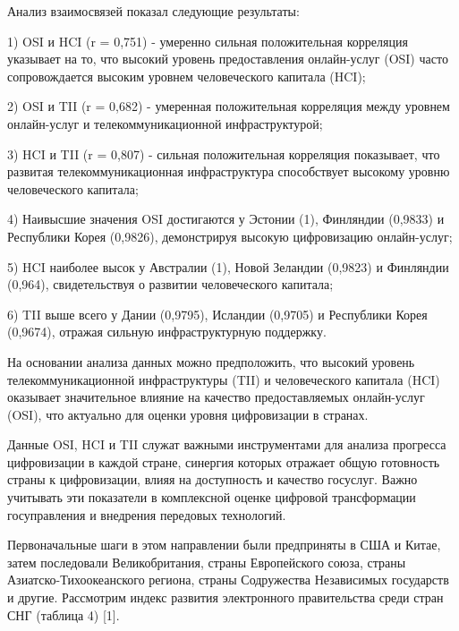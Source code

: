 \begin{multicols}{2}
Анализ взаимосвязей показал следующие результаты:

1) OSI и HCI (r = 0,751) - умеренно сильная положительная корреляция
указывает на то, что высокий уровень предоставления онлайн-услуг (OSI)
часто сопровождается высоким уровнем человеческого капитала (HCI);

2) OSI и TII (r = 0,682) - умеренная положительная корреляция между
уровнем онлайн-услуг и телекоммуникационной инфраструктурой;

3) HCI и TII (r = 0,807) - сильная положительная корреляция показывает,
что развитая телекоммуникационная инфраструктура способствует высокому
уровню человеческого капитала;

4) Наивысшие значения OSI достигаются у Эстонии (1), Финляндии (0,9833)
и Республики Корея (0,9826), демонстрируя высокую цифровизацию
онлайн-услуг;

5) HCI наиболее высок у Австралии (1), Новой Зеландии (0,9823) и
Финляндии (0,964), свидетельствуя о развитии человеческого капитала;

6) TII выше всего у Дании (0,9795), Исландии (0,9705) и Республики Корея
(0,9674), отражая сильную инфраструктурную поддержку.

На основании анализа данных можно предположить, что высокий уровень
телекоммуникационной инфраструктуры (TII) и человеческого капитала (HCI)
оказывает значительное влияние на качество предоставляемых онлайн-услуг
(OSI), что актуально для оценки уровня цифровизации в странах.

Данные OSI, HCI и TII служат важными инструментами для анализа прогресса
цифровизации в каждой стране, синергия которых отражает общую готовность
страны к цифровизации, влияя на доступность и качество госуслуг. Важно
учитывать эти показатели в комплексной оценке цифровой трансформации
госуправления и внедрения передовых технологий.

Первоначальные шаги в этом направлении были предприняты в США и Китае,
затем последовали Великобритания, страны Европейского союза, страны
Азиатско-Тихоокеанского региона, страны Содружества Независимых
государств и другие. Рассмотрим индекс развития электронного
правительства среди стран СНГ (таблица 4) {[}1{]}.
\end{multicols}

